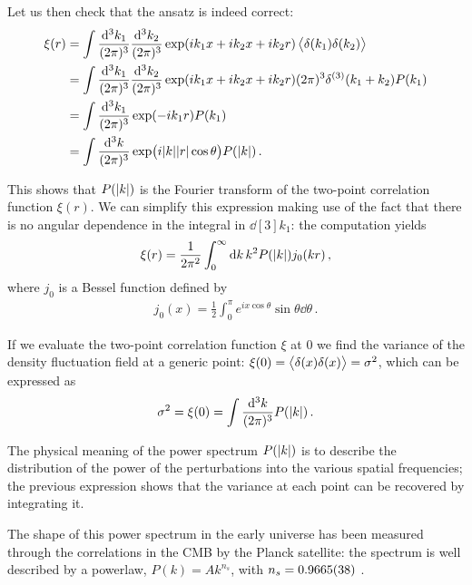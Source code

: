 \documentclass[main.tex]{subfiles}
\begin{document}
Let us then check that the ansatz is indeed correct:
%
\begin{align}
\xi (r) &= \int 
\frac{ \dd[3]{k_1}}{(2 \pi )^3} 
\frac{ \dd[3]{k_2}}{(2 \pi )^3} 
\exp(i k_1 x + i k_2 x + i k_2 r)
\expval{ \delta (k_1 ) \delta (k_2 )}  \\
&= \int 
\frac{ \dd[3]{k_1}}{(2 \pi )^3} 
\frac{ \dd[3]{k_2}}{(2 \pi )^3} 
\exp(i k_1 x + i k_2 x + i k_2 r)
(2 \pi )^3 \delta^{(3)} (k_1 + k_2 ) P(k_1 )  \\
&= \int 
\frac{\dd[3]{k_1}}{(2 \pi )^3}
\exp(- i k_1  r)
P(k_1 )   \\
&=
\int \frac{ \dd[3]{k}}{(2 \pi )^3}
\exp(i \abs{k} \abs{r} \cos \theta )
P( \abs{k})
\,.
\end{align}

This shows that \(P(\abs{k})\) is the Fourier transform of the two-point correlation function \(\xi (r)\). 
We can simplify this expression making use of the fact that there is no angular dependence in the integral in \(\dd[3]{k_1}\): 
the computation yields 
%
\begin{align}
\xi (r) = \frac{1}{2 \pi^2} \int_0^{\infty } \dd{k} k^2 P(\abs{k}) j_0 (kr)
\,,
\end{align}
%
where \(j_0 \) is a Bessel function defined by 
%
\begin{align}
j_0 (x) =  \frac{1}{2} \int_0^{\pi } e^{i x \cos \theta } \sin \theta \dd{\theta } 
\,.
\end{align}


If we evaluate the two-point correlation function \(\xi \) at 0 we find the variance of the density fluctuation field at a generic point: \(\xi (0) = \expval{ \delta (x) \delta (x)} = \sigma^2\), which can be expressed as 
%
\begin{align}
\sigma^2 = \xi (0) = \int \frac{ \dd[3]{k}}{(2 \pi )^3} P(\abs{k})
\,.
\end{align}
%

The physical meaning of the power spectrum \(P(\abs{k})\) is to describe the distribution of the power of the perturbations into the various spatial frequencies; the previous expression shows that the variance at each point can be recovered by integrating it. 

The shape of this power spectrum in the early universe has been measured through the correlations in the CMB by the Planck satellite: the spectrum is well described by a powerlaw, \(P(k) = A k^{n_s}\), with \(n_s = \num{0.9665 +- 0.0038}\) \cite[eq.\ 38]{planckcollaborationPlanck2018Results2019}.
\end{document}

